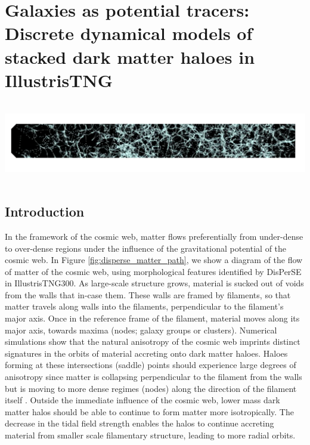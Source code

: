 \chapter[Discrete dynamical models of stacked dark matter haloes]{Galaxies as potential tracers: \\ Discrete dynamical models of stacked dark matter haloes in IllustrisTNG}
\label{ch:dyn_mod}
\vspace{-5.25in}
\includegraphics[height=1.39in]{thesis/latex/dyn_mod_files/tngcw_heading.pdf}
\vspace{3in}


\section{Introduction}
In the framework of the cosmic web, matter flows preferentially from under-dense to over-dense regions under the influence of the gravitational potential of the cosmic web. In Figure \ref{fig:disperse_matter_path}, we show a diagram of the flow of matter of the cosmic web, using morphological features identified by DisPerSE in IllustrisTNG300. As large-scale structure grows, material is sucked out of voids from the walls that in-case them. These walls are framed by filaments, so that matter travels along walls into the filaments, perpendicular to the filament's major axis. Once in the reference frame of the filament, material moves along its major axis, towards maxima (nodes; galaxy groups or clusters). Numerical simulations show that the natural anisotropy of the cosmic web imprints distinct signatures in the orbits of material accreting onto dark matter haloes. Haloes forming at these intersections (saddle) points should experience large degrees of anisotropy since matter is collapsing perpendicular to the filament from the walls but is moving to more dense regimes (nodes) along the direction of the filament itself \citep[e.g.][for galaxy properties in saddle environments]{kraljic2019saddle}. Outside the immediate influence of the cosmic web, lower mass dark matter halos should be able to continue to form matter more isotropically. The decrease in the tidal field strength enables the halos to continue accreting material from smaller scale filamentary structure, leading to more radial orbits.

